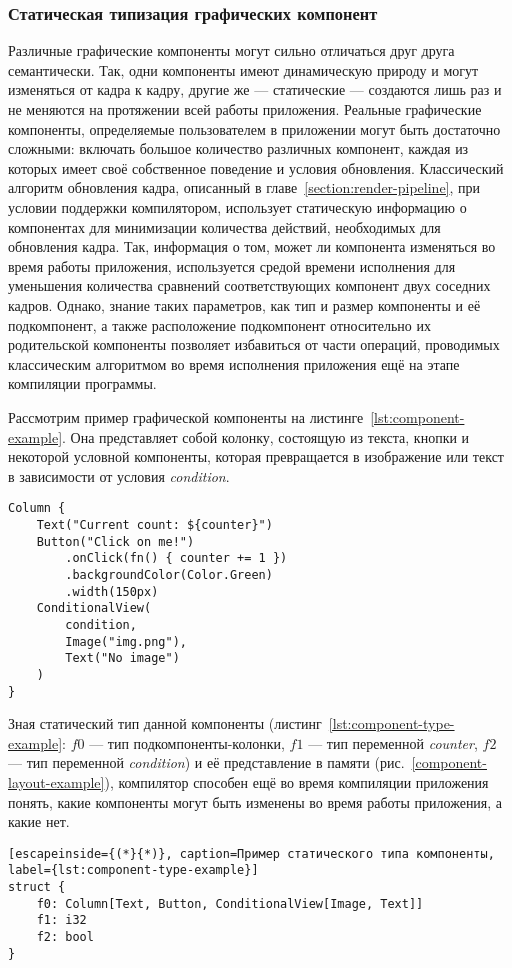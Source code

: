 \subsubsection{Статическая типизация графических компонент}
Различные графические компоненты могут сильно отличаться друг друга
семантически. Так, одни компоненты имеют динамическую
природу и могут изменяться от кадра к кадру, другие же --- статические ---
создаются лишь раз и не меняются на протяжении всей работы приложения.
Реальные графические компоненты, определяемые пользователем в приложении
могут быть достаточно сложными: включать большое количество различных
компонент, каждая из которых имеет своё собственное поведение и условия
обновления. Классический алгоритм обновления кадра, описанный
в главе~\ref{section:render-pipeline}, при условии поддержки компилятором,
использует статическую информацию о компонентах для минимизации
количества действий, необходимых для обновления кадра. Так, информация о
том, может ли компонента изменяться во время работы приложения, используется
средой времени исполнения для уменьшения количества сравнений
соответствующих компонент двух соседних кадров. Однако, знание таких
параметров, как тип и размер компоненты и её подкомпонент, а также
расположение подкомпонент относительно их родительской компоненты позволяет
избавиться от части операций, проводимых классическим алгоритмом во время
исполнения приложения ещё на этапе компиляции программы.

Рассмотрим пример графической компоненты на
листинге~\ref{lst:component-example}. Она представляет собой колонку,
состоящую из текста, кнопки и некоторой условной компоненты, которая
превращается в изображение или текст в зависимости от условия
\textit{condition}.
\begin{lstlisting}[language=my_pseudo, caption=Пример графической компоненты, label={lst:component-example}]
Column {
    Text("Current count: ${counter}")
    Button("Click on me!")
        .onClick(fn() { counter += 1 })
        .backgroundColor(Color.Green)
        .width(150px)
    ConditionalView(
        condition,
        Image("img.png"),
        Text("No image")
    )
}
\end{lstlisting}
Зная статический тип данной компоненты
(листинг~\ref{lst:component-type-example}: $f0$ --- тип
под\-ком\-по\-ненты-колонки, $f1$ --- тип переменной \textit{counter}, $f2$
--- тип переменной \textit{condition}) и её представление в памяти
(рис.~\ref{component-layout-example}), компилятор способен ещё во время
компиляции приложения понять, какие компоненты могут быть изменены
во время работы приложения, а какие нет.
\begin{lstlisting}[escapeinside={(*}{*)}, caption=Пример статического типа компоненты, label={lst:component-type-example}]
struct {
    f0: Column[Text, Button, ConditionalView[Image, Text]]
    f1: i32
    f2: bool
}
\end{lstlisting}

